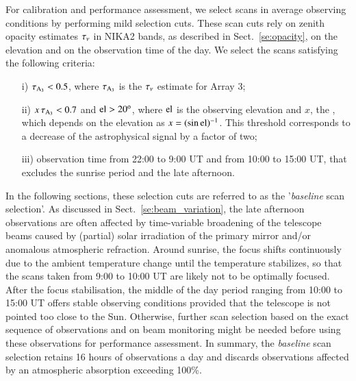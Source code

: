 For calibration and performance assessment, we select scans in average
observing conditions by performing mild selection cuts. These scan
cuts rely on zenith opacity estimates $\tau_{\nu}$ in NIKA2 bands, as
described in Sect.~\ref{se:opacity}, on the elevation and on the
observation time of the day. We select the scans satisfying the
following criteria:
%
\begin{itemize}
\item[i)] $\tau_{\rm{A_3}} < 0.5$, where $\tau_{\rm{A_3}}$ is the $\tau_{\nu}$ estimate for
  Array 3; %
\item[ii)] $x\, \tau_{\rm{A_3}} < 0.7$ and $\rm{el} > 20^{o}$, where
$\rm{el}$ is the observing elevation and $x$, the
  \airmass, which depends on the elevation as $x=(\sin{\rm{el}})^{-1}$. This
  threshold corresponds to a decrease of the astrophysical signal by a
  factor of two;
\item[iii)] observation time from 22:00 to 9:00 UT and from 10:00 to
  15:00 UT, that excludes the sunrise period and the late afternoon.
\end{itemize}
%
{\lp In the following sections, these selection cuts are referred to as the 
'\emph{baseline} scan selection'.}  
As discussed in Sect.~\ref{se:beam_variation}, the late afternoon
observations are often affected by time-variable broadening of the
telescope beams caused by (partial) solar irradiation of the primary
mirror and/or anomalous atmospheric refraction.
Around sunrise, the focus shifts continuously due to the ambient temperature
change until the temperature stabilizes, so that the scans taken from
9:00 to 10:00 UT are likely not to be optimally focused.
After the focus stabilisation, the middle of the day period ranging
from 10:00 to 15:00 UT offers stable observing conditions
provided that the telescope is not pointed too
close to the Sun.
Otherwise, further scan selection based on
the exact sequence of observations and on beam monitoring might be
needed before using these observations for performance assessment.
{\lp In summary, the \emph{baseline} scan selection retains 16 hours of
observations a day and discards observations affected by an
atmospheric absorption exceeding 100\%.}  

